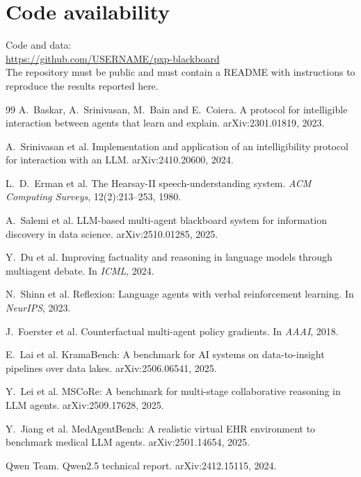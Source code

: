 \documentclass[11pt,a4paper,twocolumn]{article}
\newcommand{\githuburl}{https://github.com/USERNAME/pxp-blackboard}
\begin{document}
\section*{Code availability}
\noindent Code and data:\\
\url{\githuburl}\\
The repository must be public and must contain a README with instructions to reproduce the
results reported here.

\begin{thebibliography}{99}
\small
{}
A.~Baskar, A.~Srinivasan, M.~Bain and E.~Coiera.
\newblock A protocol for intelligible interaction between agents that learn and explain.
\newblock arXiv:2301.01819, 2023.

A.~Srinivasan et al.
\newblock Implementation and application of an intelligibility protocol for interaction
with an LLM.
\newblock arXiv:2410.20600, 2024.

L.~D.~Erman et al.
\newblock The Hearsay-II speech-understanding system.
\newblock \emph{ACM Computing Surveys}, 12(2):213--253, 1980.

A.~Salemi et al.
\newblock LLM-based multi-agent blackboard system for information discovery in data
science.
\newblock arXiv:2510.01285, 2025.

Y.~Du et al.
\newblock Improving factuality and reasoning in language models through multiagent
debate.
\newblock In \emph{ICML}, 2024.

N.~Shinn et al.
\newblock Reflexion: Language agents with verbal reinforcement learning.
\newblock In \emph{NeurIPS}, 2023.

J.~Foerster et al.
\newblock Counterfactual multi-agent policy gradients.
\newblock In \emph{AAAI}, 2018.

E.~Lai et al.
\newblock KramaBench: A benchmark for AI systems on data-to-insight pipelines over data
lakes.
\newblock arXiv:2506.06541, 2025.

Y.~Lei et al.
\newblock MSCoRe: A benchmark for multi-stage collaborative reasoning in LLM agents.
\newblock arXiv:2509.17628, 2025.

Y.~Jiang et al.
\newblock MedAgentBench: A realistic virtual EHR environment to benchmark medical LLM
agents.
\newblock arXiv:2501.14654, 2025.

Qwen Team.
\newblock Qwen2.5 technical report.
\newblock arXiv:2412.15115, 2024.
\end{thebibliography}
\end{document}
